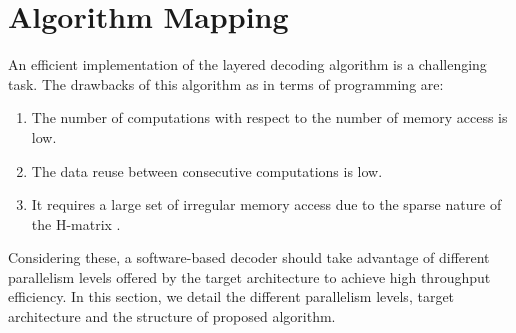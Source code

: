 \documentclass[10pt,a4paper]{article}
\begin{document}
\section{Algorithm Mapping}\label{sec3}

An efficient implementation of the layered decoding algorithm is a challenging task. The drawbacks of this algorithm as in terms of programming are:
\begin{enumerate}
\item The number of computations with respect to the number of memory access is low.
\item The data reuse between consecutive computations is low.
\item It requires a large set of irregular memory access due to the sparse nature of the H-matrix \cite{art_ldpc_cpu1}.
\end{enumerate}
Considering these, a software-based decoder should take advantage of different parallelism levels offered by the target architecture to achieve high throughput efficiency. In this section, we detail the different parallelism levels, target architecture and the structure of proposed algorithm.
\end{document}
